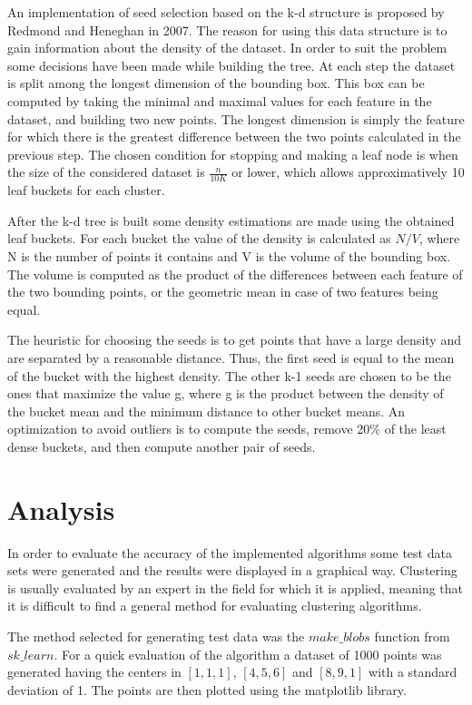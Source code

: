 \documentclass[12pt]{article}
\begin{document}
	An implementation of seed selection based on the k-d structure is proposed by Redmond and Heneghan\cite{KdTreeKmeans} in 2007. The reason for using this data structure is to gain information about the density of the dataset. In order to suit the problem some decisions have been made while building the tree. At each step the dataset is split among the longest dimension of the bounding box. This box can be computed by taking the minimal and maximal values for each feature in the dataset, and building two new points. The longest dimension is simply the feature for which there is the greatest difference between the two points calculated in the previous step. The chosen condition for stopping and making a leaf node is when the size of the considered dataset is \(\frac{n}{10K}\) or lower, which allows approximatively 10 leaf buckets for each cluster.
	
	After the k-d tree is built some density estimations are made using the obtained leaf buckets. For each bucket the value of the density is calculated as \( N / V \), where N is the number of points it contains and V is the volume of the bounding box. The volume is computed as the product of the differences between each feature of the two bounding points, or the geometric mean in case of two features being equal. 
	
	The heuristic for choosing the seeds is to get points that have a large density and are separated by a reasonable distance. Thus, the first seed is equal to the mean of the bucket with the highest density. The other k-1 seeds are chosen to be the ones that maximize the value g, where g is the product between the density of the bucket mean and the minimum distance to other bucket means. An optimization to avoid outliers is to compute the seeds, remove 20\% of the least dense buckets, and then compute another pair of seeds.
	
	\section{Analysis}
	In order to evaluate the accuracy of the implemented algorithms some test data sets were generated and the results were displayed in a graphical way. Clustering is usually evaluated by an expert in the field for which it is applied, meaning that it is difficult to find a general method for evaluating clustering algorithms.
	
	The method selected for generating test data was the $make\_blobs$ function from $sk\_learn$\cite{sk-learn}. For a quick evaluation of the algorithm a dataset of 1000 points was generated having the centers in $[1, 1, 1]$, $[4, 5, 6]$ and $[8, 9, 1]$ with a standard deviation of 1. The points are then plotted using the matplotlib \cite{Matplotlib} library.
	
\end{document}
